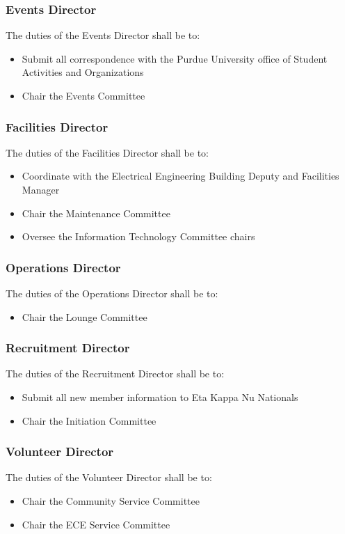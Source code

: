 \documentclass[10pt, oneside]{article}
\begin{document}
\subsubsection{Events Director}
The duties of the Events Director shall be to:
\begin{itemize}
\item Submit all correspondence with the Purdue University office of Student Activities and Organizations
\item Chair the Events Committee
\end{itemize}
\subsubsection{Facilities Director}
The duties of the Facilities Director shall be to:
\begin{itemize}
\item Coordinate with the Electrical Engineering Building Deputy and Facilities Manager
\item Chair the Maintenance Committee
\item Oversee the Information Technology Committee chairs
\end{itemize}
\subsubsection{Operations Director}
The duties of the Operations Director shall be to:
\begin{itemize}
\item Chair the Lounge Committee
\end{itemize}
\subsubsection{Recruitment Director}
The duties of the Recruitment Director shall be to:
\begin{itemize}
\item Submit all new member information to Eta Kappa Nu Nationals
\item Chair the Initiation Committee
\end{itemize}
\subsubsection{Volunteer Director}
The duties of the Volunteer Director shall be to:
\begin{itemize}
\item Chair the Community Service Committee
\item Chair the ECE Service Committee
\end{itemize}
\end{document}
